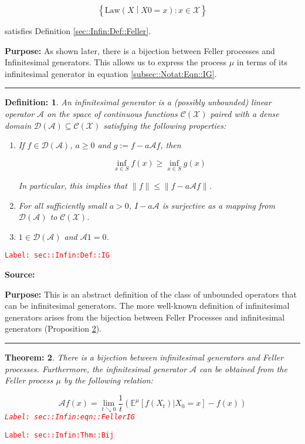 \documentclass[12pt]{article}
\newcommand{\mb}{\mathbb}
\newcommand{\mc}{\mathcal}
\newcommand{\te}{\text}
\newcommand{\tr}{\textcolor{red}}
\newcommand{\labe}[1]{\tr{\texttt{Label: #1}}}
\newcommand{\purpose}{\textbf{Purpose: }}
\newcommand{\lin}{\rule{\linewidth}{0.4 pt}}
\newcommand{\x}{x}								%
\newcommand{\X}{X}								%
\newcommand{\IG}{\mc{A}}						%
\newcommand{\law}{\te{Law}}							%
\newtheorem{thms}{Theorem: }[section]
\newtheorem{defn}[thms]{Definition: }
\begin{document}
\[\left\{\law\left(\X{}{}\middle|\X{}{0} = \x{}{}\right): \x{}{} \in \mc{X}\right\}\]

satisfies Definition \ref{sec::Infin:Def::Feller}.

\purpose As shown later, there is a bijection between Feller processes and Infinitesimal generators. This allows us to express the process \(\mu\) in terms of its infinitesimal generator in equation \eqref{subsec::Notat:Eqn::IG}.

\lin

\begin{defn}
An infinitesimal generator is a (possibly unbounded) linear operator \(\IG{}\) on the space of continuous functions \(\mc{C}(\mc{X})\) paired with a dense domain \(\mc{D}(\IG{}) \subseteq \mc{C}(\mc{X})\) satisfying the following properties:

\begin{enumerate}
\item If \(f \in \mc{D}(\IG{})\), \(a \geq 0\) and \(g:= f - a\IG{} f\), then 

\[\inf_{x \in S} f(x) \geq \inf_{x \in S} g(x)\]

\noindent In particular, this implies that \(\|f\| \leq \|f - a\IG{} f\|\).

\item For all sufficiently small \(a > 0\), \(I - a\IG{}\) is surjective as a mapping from \(\mc{D}(\IG{})\) to \(\mc{C}(\mc{X})\).

\item \(1 \in \mc{D}(\IG{})\) and \(\IG{} 1 = 0\).
\end{enumerate}
\label{sec::Infin:Def::IG}
\end{defn}
\labe{sec::Infin:Def::IG}

\textbf{Source: }\cite[Definitions 2.1,2.7]{Lig85}

\purpose This is an abstract definition of the class of unbounded operators that can be infinitesimal generators. The more well-known definition of infinitesimal generators arises from the bijection between Feller Processes and infinitesimal generators (Proposition \ref{sec::Infin:Thm::Bij}).

\lin

\begin{thms}
There is a bijection between infinitesimal generators and Feller processes. Furthermore, the infinitesimal generator \(\IG{}\) can be obtained from the Feller process \(\mu\) by the following relation:

\begin{equation}
\mc{A}f(x) = \lim_{t\searrow 0} \frac{1}{t}\left(\mb{E}^\mu[f(X_t)|X_0=x] - f(x)\right)
\label{sec::Infin:eqn::FellerIG}
\end{equation}
\labe{sec::Infin:eqn::FellerIG}
\label{sec::Infin:Thm::Bij}
\end{thms}
\labe{sec::Infin:Thm::Bij}
\end{document}
